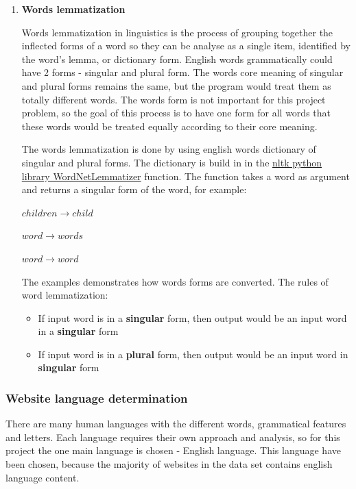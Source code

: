 \begin{enumerate}
    \item \textbf{Words lemmatization}
    
    Words lemmatization  in linguistics is the process of grouping together the inflected forms of a word so they can be analyse as a single item, identified by the word's lemma, or dictionary form. English words grammatically could have 2 forms - singular and plural form. The words core meaning of singular and plural forms remains the same, but the program would treat them as totally different words. The words form is not important for this project problem, so the goal of this process is to have one form for all words that these words would be treated equally according to their core meaning. 
    
    The words lemmatization is done by using english words dictionary of singular and plural forms. The dictionary is build in in the \href{https://www.nltk.org/_modules/nltk/stem/wordnet.html}{nltk python library WordNetLemmatizer} function. The function takes a word as argument and returns a singular form of the word, for example:
    
    
        $children \longrightarrow child$
        
        $word  \longrightarrow words$
    
        $word \longrightarrow word$
        
        
    The examples demonstrates how words forms are converted. The rules of word lemmatization:
    \begin{itemize}
        \item If input word is in a \textbf{singular} form, then output would be an input word in a \textbf{singular} form
        \item If input word is in a \textbf{plural} form, then output would be an input word in \textbf{singular} form
    \end{itemize}
\end{enumerate}

\subsubsection{Website language determination}

There are many human languages with the different words, grammatical features and letters. Each language requires their own approach and analysis, so for this project the one main language is chosen - English language. This language have been chosen, because the majority of websites in the data set contains english language content.

